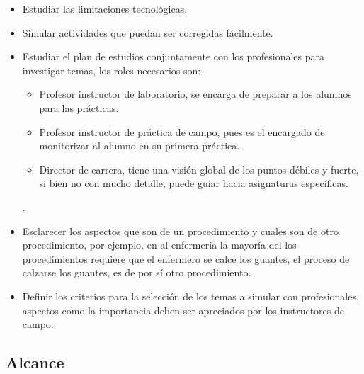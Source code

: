 \begin{itemize}

\item Estudiar las limitaciones tecnológicas.
\item Simular actividades que puedan ser corregidas fácilmente.
\item Estudiar el plan de estudios conjuntamente con los profesionales para
    investigar temas, los roles necesarios son:
    \begin{itemize}
        \item Profesor instructor de laboratorio, se encarga de preparar a los
            alumnos para las prácticas.
        \item Profesor instructor de práctica de campo, pues es el encargado de
            monitorizar al alumno en su primera práctica.
        \item Director de carrera, tiene una visión global de los puntos débiles
            y fuerte, si bien no con mucho detalle, puede guiar hacia
            asignaturas específicas.
    \end{itemize}.
\item Esclarecer los aspectos que son de un procedimiento y cuales son de otro
    procedimiento, por ejemplo, en al enfermería la mayoría del los
    procedimientos requiere que el enfermero se calce los guantes, el proceso de
    calzarse los guantes, es de por sí otro procedimiento.
\item Definir los criterios para la selección de los temas a simular con
    profesionales, aspectos como la importancia deben ser apreciados por los
    instructores de campo.

\end{itemize}

\subsection{Alcance} 

